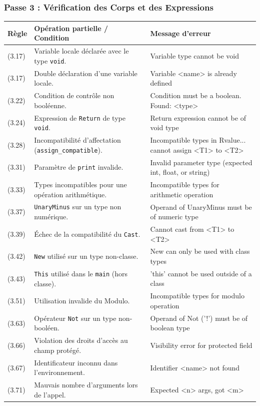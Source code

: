 \subsubsection{Passe 3 : Vérification des Corps et des Expressions}

\begin{center}
\renewcommand{\arraystretch}{1.5}
\begin{tabular}{|l|p{8cm}|p{6cm}|}
    \hline
    \rowcolor{gray!20} \textbf{Règle} & \textbf{Opération partielle / Condition} & \textbf{Message d'erreur} \\ \hline
    (3.17) & Variable locale déclarée avec le type \texttt{void}. & Variable type cannot be void \\ \hline
    (3.17) & Double déclaration d'une variable locale. & Variable <name> is already defined \\ \hline
    (3.22) & Condition de contrôle non booléenne. & Condition must be a boolean. Found: <type> \\ \hline
    (3.24) & Expression de \texttt{Return} de type \texttt{void}. & Return expression cannot be of void type \\ \hline
    (3.28) & Incompatibilité d'affectation (\texttt{assign\_compatible}). & Incompatible types in Rvalue... cannot assign <T1> to <T2> \\ \hline
    (3.31) & Paramètre de \texttt{print} invalide. & Invalid parameter type (expected int, float, or string) \\ \hline
    (3.33) & Types incompatibles pour une opération arithmétique. & Incompatible types for arithmetic operation \\ \hline
    (3.37) & \texttt{UnaryMinus} sur un type non numérique. & Operand of UnaryMinus must be of numeric type \\ \hline
    (3.39) & Échec de la compatibilité du \texttt{Cast}. & Cannot cast from <T1> to <T2> \\ \hline
    (3.42) & \texttt{New} utilisé sur un type non-classe. & New can only be used with class types \\ \hline
    (3.43) & \texttt{This} utilisé dans le \texttt{main} (hors classe). & 'this' cannot be used outside of a class \\ \hline
    (3.51) & Utilisation invalide du Modulo. & Incompatible types for modulo operation \\ \hline
    (3.63) & Opérateur \texttt{Not} sur un type non-booléen. & Operand of Not ('!') must be of boolean type \\ \hline
    (3.66) & Violation des droits d'accès au champ protégé. & Visibility error for protected field \\ \hline
    (3.67) & Identificateur inconnu dans l'environnement. & Identifier <name> not found \\ \hline
    (3.71) & Mauvais nombre d'arguments lors de l'appel. & Expected <n> args, got <m> \\ \hline
\end{tabular}
\end{center}

